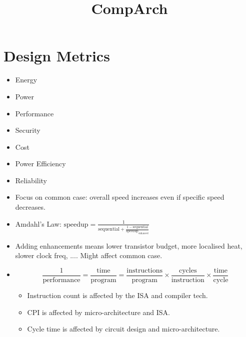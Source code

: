\documentclass[11pt]{article}
\title{\vspace{-2.5cm}CompArch\vspace{-2cm}}
\author{}
\date{}
\begin{document}
\maketitle

\section*{Design Metrics}
{ 
    \begin{minipage}[t]{0.3\textwidth}
    \begin{itemize}
    \item Energy
    \item Power
    \item Performance
    \item Security
    \item Cost
    \item Power Efficiency
    \item Reliability
    \end{itemize}
    \end{minipage}
    \begin{minipage}[t]{0.65\textwidth}
    \begin{itemize}
    \item Focus on common case: overall speed increases even if specific speed decreases.
    \item Amdahl's Law: \(\text{speedup} = \frac{1}{\text{sequential} + \frac{1 - \text{sequential}}{\text{speedup}_\text{enhanced}}}\)
    \item Adding enhancements means lower transistor budget, more localised heat, slower clock freq, .... Might affect common case.
    \item
    {
        \[\frac{1}{\text{performance}} = \frac{\text{time}}{\text{program}} = \frac{\text{instructions}}{\text{program}} \times \frac{\text{cycles}}{\text{instruction}} \times \frac{\text{time}}{\text{cycle}}\]

        \begin{itemize}
        \item Instruction count is affected by the ISA and compiler tech.
        \item CPI is affected by micro-architecture and ISA.
        \item Cycle time is affected by circuit design and micro-architecture.
        \end{itemize}
    }
    \end{itemize}
    \end{minipage}
}
\end{document}
